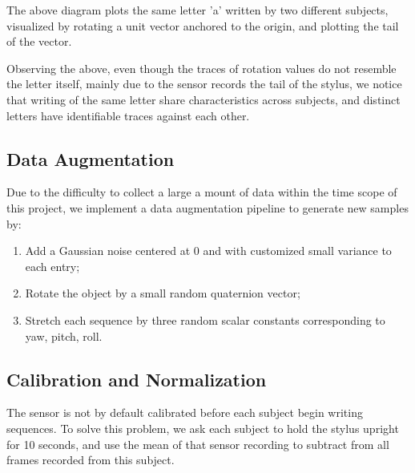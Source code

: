 \documentclass{article}
\begin{document}
\begin{multicols*}{2}
\vspace{-10px}

The above diagram plots the same letter 'a' written by two different subjects, visualized by rotating a unit vector anchored to the origin, and plotting the tail of the vector. 



Observing the above, even though the traces of rotation values do not resemble the letter itself, mainly due to the sensor records the tail of the stylus, we notice that writing of the same letter share characteristics across subjects, and distinct letters have identifiable traces against each other.

\subsection{Data Augmentation}

Due to the difficulty to collect a large a mount of data within the time scope of this project, we implement a data augmentation pipeline to generate new samples by:
\begin{enumerate}
    \item Add a Gaussian noise centered at 0 and with customized small variance to each entry;
    \item Rotate the object by a small random quaternion vector;
    \item Stretch each sequence by three random scalar constants corresponding to yaw, pitch, roll.
\end{enumerate}

\subsection{Calibration and Normalization}

The sensor is not by default calibrated before each subject begin writing sequences. To solve this problem, we ask each subject to hold the stylus upright for 10 seconds, and use the mean of that sensor recording to subtract from all frames recorded from this subject. 


\end{multicols*}
\end{document}
